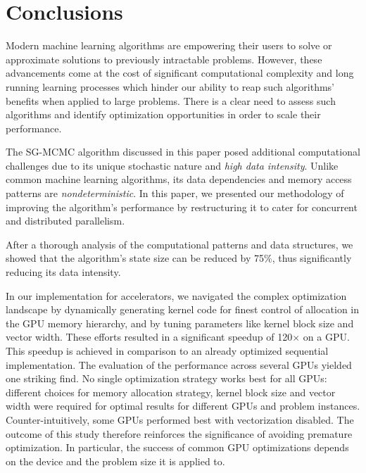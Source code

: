 \section{Conclusions}
\label{sec-conclusion}

Modern machine learning algorithms are empowering their
users to solve or approximate solutions to previously intractable problems.
However, these advancements come at the cost of significant computational
complexity and long running learning processes which hinder our ability to reap
such algorithms' benefits when applied to large problems. There is a clear need
to assess such algorithms and identify optimization opportunities in order to
scale their performance.

The SG-MCMC algorithm discussed in this paper posed additional computational
challenges due to its unique stochastic nature and \emph{high data intensity}. Unlike
common machine learning algorithms, its data dependencies and memory access
patterns are \emph{nondeterministic}. In this paper, we presented our methodology of
improving the algorithm's performance by restructuring it to
cater for concurrent and distributed parallelism.

After a thorough
analysis of the computational patterns and data structures,
we showed that the algorithm's state size can be reduced by 75\%,
thus significantly
reducing its data intensity.

In our implementation for accelerators, we navigated the complex optimization
landscape by dynamically generating kernel code for finest control of allocation in
the GPU memory hierarchy, and by tuning parameters like kernel block size and vector
width. These efforts resulted in
a significant speedup of 120$\times$ on a GPU.
This speedup is achieved in comparison to an already
optimized sequential implementation. The evaluation of the performance
across several GPUs yielded one striking find. No single optimization strategy
works best for all GPUs: different choices for memory allocation strategy,
kernel block size and vector width were required for optimal results for
different GPUs and problem instances. Counter-intuitively, some GPUs performed
best with vectorization disabled.
%
The outcome of this study therefore reinforces the significance of avoiding premature
optimization. In particular, the success
of common GPU optimizations depends on the device and the
problem size it is applied to.

